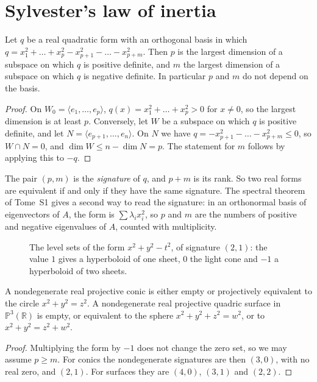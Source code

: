 \section{Sylvester's law of inertia}

\begin{theorem}\label{thm:sylvester}
Let $q$ be a real quadratic form with an orthogonal basis in which $q=x_1^2+\dots+x_p^2-x_{p+1}^2-\dots-x_{p+m}^2$. Then $p$ is the largest dimension
of a subspace on which $q$ is positive definite, and $m$ the largest dimension of a subspace on which $q$ is negative definite. In particular $p$ and
$m$ do not depend on the basis.
\end{theorem}

\begin{proof}
On $W_0=\langle e_1,\dots,e_p\rangle$, $q(x)=x_1^2+\dots+x_p^2>0$ for $x\ne0$, so the largest dimension is at least $p$. Conversely, let $W$ be a
subspace on which $q$ is positive definite, and let $N=\langle e_{p+1},\dots,e_n\rangle$. On $N$ we have $q=-x_{p+1}^2-\dots-x_{p+m}^2\le0$, so
$W\cap N=0$, and $\dim W\le n-\dim N=p$. The statement for $m$ follows by applying this to $-q$.
\end{proof}

The pair $(p,m)$ is the \emph{signature} of $q$, and $p+m$ is its rank. So two real forms are equivalent if and only if they have the same signature.
The spectral theorem of Tome~S1 gives a second way to read the signature: in an orthonormal basis of eigenvectors of $A$, the form is
$\sum\lambda_ix_i^2$, so $p$ and $m$ are the numbers of positive and negative eigenvalues of $A$, counted with multiplicity.

\begin{figure}[ht]
\centering
{}
\caption{The level sets of the form $x^2+y^2-t^2$, of signature $(2,1)$: the value $1$ gives a hyperboloid of one sheet, $0$ the light cone and
$-1$ a hyperboloid of two sheets.}
\label{fig:lorentz}
\end{figure}

\begin{corollary}\label{cor:realconics}
A nondegenerate real projective conic is either empty or projectively equivalent to the circle $x^2+y^2=z^2$. A nondegenerate real projective quadric
surface in $\mathbb P^3(\mathbb R)$ is empty, or equivalent to the sphere $x^2+y^2+z^2=w^2$, or to $x^2+y^2=z^2+w^2$.
\end{corollary}

\begin{proof}
Multiplying the form by $-1$ does not change the zero set, so we may assume $p\ge m$. For conics the nondegenerate signatures are then $(3,0)$, with
no real zero, and $(2,1)$. For surfaces they are $(4,0)$, $(3,1)$ and $(2,2)$.
\end{proof}

